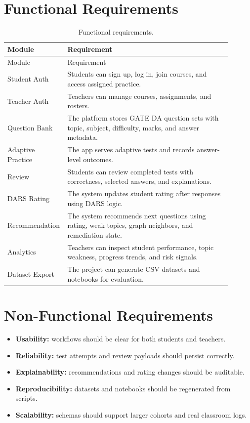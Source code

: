 \documentclass[12pt,a4paper]{report}
\begin{document}
\section{Functional Requirements}
\begin{longtable}{p{0.18\linewidth}p{0.72\linewidth}}
\caption{Functional requirements.}\\
\toprule
Module & Requirement \\
\midrule
\endfirsthead
\toprule
Module & Requirement \\
\midrule
\endhead
Student Auth & Students can sign up, log in, join courses, and access assigned practice.\\
Teacher Auth & Teachers can manage courses, assignments, and rosters.\\
Question Bank & The platform stores GATE DA question sets with topic, subject, difficulty, marks, and answer metadata.\\
Adaptive Practice & The app serves adaptive tests and records answer-level outcomes.\\
Review & Students can review completed tests with correctness, selected answers, and explanations.\\
DARS Rating & The system updates student rating after responses using DARS logic.\\
Recommendation & The system recommends next questions using rating, weak topics, graph neighbors, and remediation state.\\
Analytics & Teachers can inspect student performance, topic weakness, progress trends, and risk signals.\\
Dataset Export & The project can generate CSV datasets and notebooks for evaluation.\\
\bottomrule
\end{longtable}

\section{Non-Functional Requirements}
\begin{itemize}[leftmargin=*]
  \item \textbf{Usability:} workflows should be clear for both students and teachers.
  \item \textbf{Reliability:} test attempts and review payloads should persist correctly.
  \item \textbf{Explainability:} recommendations and rating changes should be auditable.
  \item \textbf{Reproducibility:} datasets and notebooks should be regenerated from scripts.
  \item \textbf{Scalability:} schemas should support larger cohorts and real classroom logs.
\end{itemize}
\end{document}
